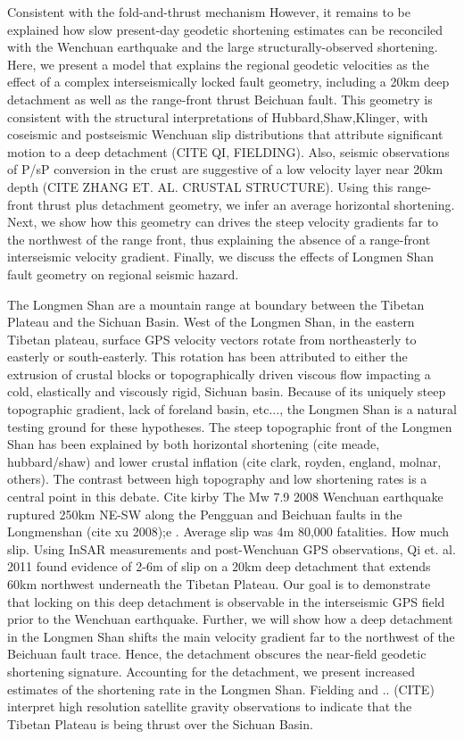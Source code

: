 \documentclass{article}
\begin{document}
Consistent with the fold-and-thrust mechanism
However, it remains to be explained how slow present-day geodetic shortening estimates can be reconciled with the Wenchuan earthquake and the large structurally-observed shortening.
Here, we present a model that explains the regional geodetic velocities as the effect of a complex interseismically locked fault geometry, including a 20km deep detachment as well as the range-front thrust Beichuan fault.
This geometry is consistent with the structural interpretations of Hubbard,Shaw,Klinger, with coseismic and postseismic Wenchuan slip distributions that attribute significant motion to a deep detachment (CITE QI, FIELDING).  
Also, seismic observations of P/sP conversion in the crust are suggestive of a low velocity layer near 20km depth (CITE ZHANG ET. AL. CRUSTAL STRUCTURE). 
Using this range-front thrust plus detachment geometry, we infer an average horizontal shortening.
Next, we show how this geometry can drives the steep velocity gradients far to the northwest of the range front, thus explaining the absence of a range-front interseismic velocity gradient.
Finally, we discuss the effects of Longmen Shan fault geometry on regional seismic hazard.


The Longmen Shan are a mountain range at boundary between the Tibetan Plateau and the Sichuan Basin. West of the Longmen Shan, in the eastern Tibetan plateau, surface GPS velocity vectors rotate from northeasterly to easterly or south-easterly. 
This rotation has been attributed to either the extrusion of crustal blocks or topographically driven viscous flow impacting a cold, elastically and viscously rigid, Sichuan basin.
Because of its uniquely steep topographic gradient, lack of foreland basin, etc..., the Longmen Shan is a natural testing ground for these hypotheses.
The steep topographic front of the Longmen Shan has been explained by both horizontal shortening (cite meade, hubbard/shaw) and lower crustal inflation (cite clark, royden, england, molnar, others). 
The contrast between high topography and low shortening rates is a central point in this debate.
Cite kirby
The Mw 7.9 2008 Wenchuan earthquake ruptured 250km NE-SW along the Pengguan and Beichuan faults in the Longmenshan (cite xu 2008);e .
Average slip was 4m 
80,000 fatalities. How much slip.
Using InSAR measurements and post-Wenchuan GPS observations, Qi et. al. 2011 found evidence of 2-6m of slip on a 20km deep detachment that extends 60km northwest underneath the Tibetan Plateau. 
Our goal is to demonstrate that locking on this deep detachment is observable in the interseismic GPS field prior to the Wenchuan earthquake.
Further, we will show how a deep detachment in the Longmen Shan shifts the main velocity gradient far to the northwest of the Beichuan fault trace.
Hence, the detachment obscures the near-field geodetic shortening signature. 
Accounting for the detachment, we present increased estimates of the shortening rate in the Longmen Shan.
Fielding and .. (CITE) interpret high resolution satellite gravity observations to indicate that the Tibetan Plateau is being thrust over the Sichuan Basin.
\end{document}
